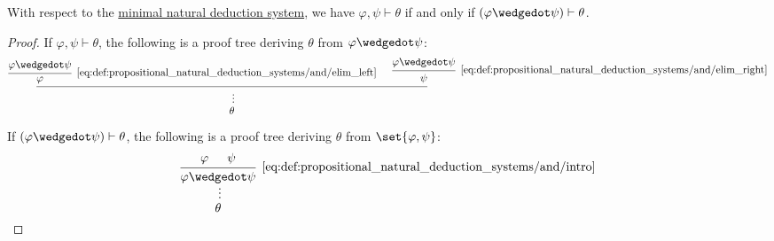 \begin{proposition}\label{thm:syntactic_propositional_conjunction_of_premises}
  With respect to the \hyperref[def:propositional_natural_deduction_systems]{minimal natural deduction system}, we have \( \varphi, \psi \vdash \theta \) if and only if \( (\varphi \synwedge \psi) \vdash \theta \).
\end{proposition}
\begin{proof}
  \SufficiencySubProof If \( \varphi, \psi \vdash \theta \), the following is a proof tree deriving \( \theta \) from \( \varphi \synwedge \psi \):
  \begin{equation*}
    \begin{prooftree}
      \hypo{ \varphi \synwedge \psi }
      \infer1[\ref{eq:def:propositional_natural_deduction_systems/and/elim_left}]{ \varphi }

      \hypo{ \varphi \synwedge \psi }
      \infer1[\ref{eq:def:propositional_natural_deduction_systems/and/elim_right}]{ \psi }

      \infer2{}

      \ellipsis {} { \theta }
    \end{prooftree}
  \end{equation*}

  \NecessitySubProof If \( (\varphi \synwedge \psi) \vdash \theta \), the following is a proof tree deriving \( \theta \) from \( \set{ \varphi, \psi } \):
  \begin{equation*}
    \begin{prooftree}
      \hypo{ \varphi }
      \hypo{ \psi }
      \infer2[\ref{eq:def:propositional_natural_deduction_systems/and/intro}]{ \varphi \synwedge \psi }
      \ellipsis{}{ \theta }
    \end{prooftree}
  \end{equation*}
\end{proof}

